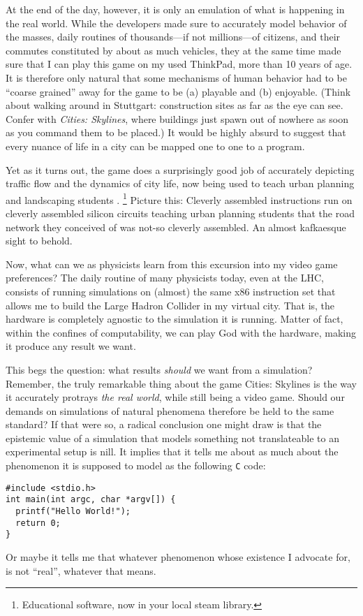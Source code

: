 At the end of the day, however, it is only an emulation of what is happening in
the real world. While the developers made sure to accurately model behavior of
the masses, daily routines of thousands---if not millions---of citizens, and
their commutes constituted by about as much vehicles, they at the same time
made sure that I can play this game on my used ThinkPad, more than 10 years of age. It is
therefore only natural that some mechanisms of human behavior had to be
\enquote{coarse grained} away for the game to be (a) playable and (b)
enjoyable. (Think about walking around in Stuttgart: construction sites as far
as the eye can see. Confer with \emph{Cities: Skylines}, where buildings just
spawn out of nowhere as soon as you command them to be placed.)
It would be highly absurd to suggest that every nuance of life in a city can
be mapped one to one to a program.

Yet as it turns out, the game does a surprisingly good job of accurately
depicting traffic flow and the dynamics of city life, now being used to teach
urban planning and landscaping students
\cite{khanPerceptionsStudentsGamification2021,haahtelaGamificationEducationCities2015}.
\footnote{Educational software, now in your local steam library.}
Picture this: Cleverly assembled instructions run on cleverly assembled
silicon circuits teaching urban planning students that the road network they
conceived of was not-so cleverly assembled. An almost kafkaesque sight to
behold.

Now, what can we as physicists learn from this excursion into my video game
preferences? The daily routine of many physicists today, even at the LHC,
consists of running simulations on (almost) the same x86 instruction set that
allows me to build the Large Hadron Collider in my virtual city. That is, the
hardware is completely agnostic to the simulation it is running. Matter of
fact, within the confines of computability, we can play God with the hardware,
making it produce any result we want.

This begs the question: what results \emph{should} we want from a simulation? Remember, the truly
remarkable thing about the game Cities: Skylines is the way it accurately
protrays \emph{the real world}, while still being a video game. Should our demands on
simulations of natural phenomena therefore be held to the same standard? If
that were so, a radical conclusion one might draw is that the epistemic value
of a simulation that models something not translateable to an experimental
setup is nill. It implies that it tells me about as much about the phenomenon it is supposed to model as
the following \texttt{C} code:
\begin{verbatim}
#include <stdio.h>
int main(int argc, char *argv[]) {
  printf("Hello World!");
  return 0;
}
\end{verbatim}
Or maybe it tells me that whatever phenomenon whose existence I advocate for,
is not \enquote{real}, whatever that means.

